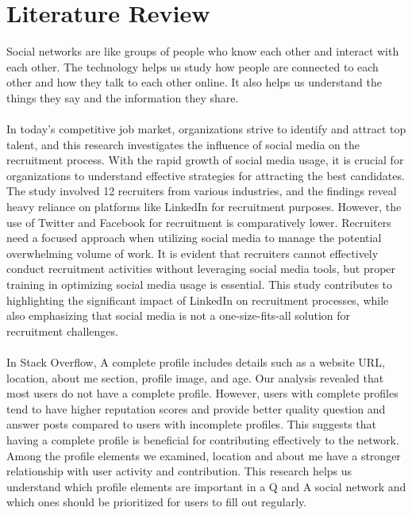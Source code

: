 \section{Literature Review}
Social networks are like groups of people who know each other and interact with each other. The technology helps us study how people are connected to each other and how they talk to each other online. It also helps us understand the things they say and the information they share.\cite{korshunov2014social}\\\\
In today's competitive job market, organizations strive to identify and attract top talent, and this research investigates the influence of social media on the recruitment process. With the rapid growth of social media usage, it is crucial for organizations to understand effective strategies for attracting the best candidates. The study involved 12 recruiters from various industries, and the findings reveal heavy reliance on platforms like LinkedIn for recruitment purposes. However, the use of Twitter and Facebook for recruitment is comparatively lower. Recruiters need a focused approach when utilizing social media to manage the potential overwhelming volume of work. It is evident that recruiters cannot effectively conduct recruitment activities without leveraging social media tools, but proper training in optimizing social media usage is essential. This study contributes to highlighting the significant impact of LinkedIn on recruitment processes, while also emphasizing that social media is not a one-size-fits-all solution for recruitment challenges.\cite{koch2018impact}\\\\
In Stack Overflow, A complete profile includes details such as a website URL, location, about me section, profile image, and age. Our analysis revealed that most users do not have a complete profile. However, users with complete profiles tend to have higher reputation scores and provide better quality question and answer posts compared to users with incomplete profiles. This suggests that having a complete profile is beneficial for contributing effectively to the network. Among the profile elements we examined, location and about me have a stronger relationship with user activity and contribution. This research helps us understand which profile elements are important in a Q and A social network and which ones should be prioritized for users to fill out regularly.\cite{adaji2016towards}\\\\
